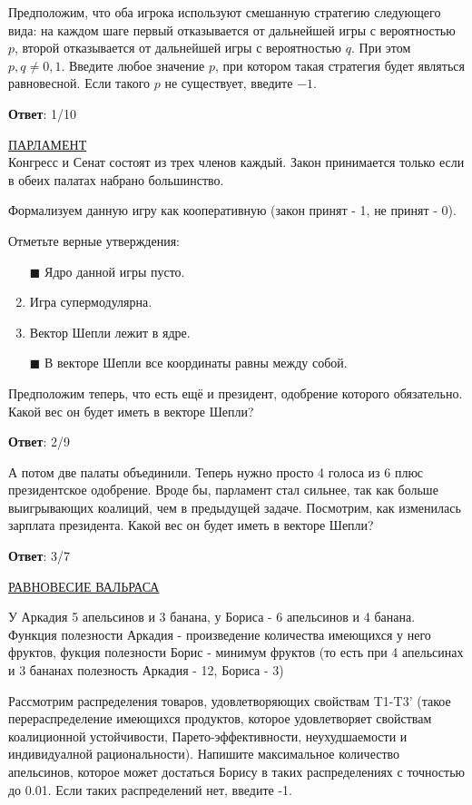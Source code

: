 \task
Предположим, что оба игрока используют смешанную стратегию следующего вида: на каждом шаге первый отказывается от дальнейшей игры с вероятностью $p$, второй отказывается от дальнейшей игры с вероятностью $q$. При этом $p,q \neq 0,1$. Введите любое значение $p$, при котором такая стратегия будет являться равновесной. Если такого $p$ не существует, введите $-1$.

\textbf{Ответ}: %
1/10

\task
\underline{ПАРЛАМЕНТ} \\

Конгресс и Сенат состоят из трех членов каждый. Закон принимается только если в обеих палатах набрано большинство.

Формализуем данную игру как кооперативную (закон принят - 1, не принят - 0).

Отметьте верные утверждения:

\begin{enumerate}[label=$\square$]
	\item[$\blacksquare$] Ядро данной игры пусто.
	\item Игра супермодулярна.
	\item Вектор Шепли лежит в ядре.
	\item[$\blacksquare$] В векторе Шепли все координаты равны между собой.
\end{enumerate}

\task
Предположим теперь, что есть ещё и президент, одобрение которого обязательно. Какой вес он будет иметь в векторе Шепли?

\textbf{Ответ}: 
2/9

\task
А потом две палаты объединили. Теперь нужно просто 4 голоса из 6 плюс президентское одобрение. Вроде бы, парламент стал сильнее, так как больше выигрывающих коалиций, чем в предыдущей задаче. Посмотрим, как изменилась зарплата президента. Какой вес он будет иметь в векторе Шепли?

\textbf{Ответ}: 
3/7  %

\task
\underline{РАВНОВЕСИЕ ВАЛЬРАСА}

У Аркадия 5 апельсинов и 3 банана, у Бориса - 6 апельсинов и 4 банана. Функция полезности Аркадия - произведение количества имеющихся у него фруктов, фукция полезности Борис - минимум фруктов (то есть при 4 апельсинах и 3 бананах полезность Аркадия - 12, Бориса - 3)

Рассмотрим распределения товаров, удовлетворяющих свойствам T1-T3' (такое перераспределение имеющихся продуктов, которое удовлетворяет свойствам коалиционной устойчивости, Парето-эффективности, неухудшаемости и индивидуалной рациональности). Напишите максимальное количество апельсинов, которое может достаться Борису в таких распределениях с точностью до 0.01. Если таких распределений нет, введите -1.

